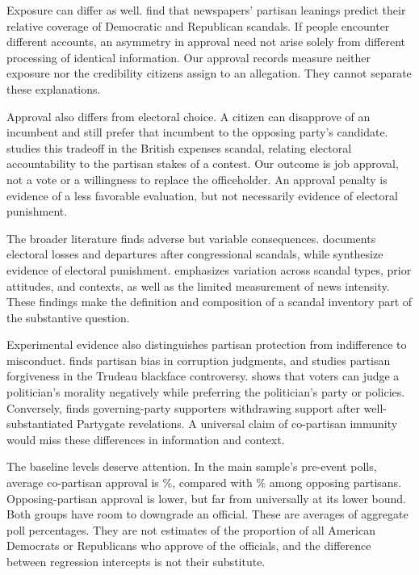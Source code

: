 \documentclass[11pt]{article}
\begin{document}
Exposure can differ as well. \citet{puglisi2011} find that newspapers' partisan leanings predict their relative coverage of Democratic and Republican scandals. If people encounter different accounts, an asymmetry in approval need not arise solely from different processing of identical information. Our approval records measure neither exposure nor the credibility citizens assign to an allegation. They cannot separate these explanations.

Approval also differs from electoral choice. A citizen can disapprove of an incumbent and still prefer that incumbent to the opposing party's candidate. \citet{eggers2014} studies this tradeoff in the British expenses scandal, relating electoral accountability to the partisan stakes of a contest. Our outcome is job approval, not a vote or a willingness to replace the officeholder. An approval penalty is evidence of a less favorable evaluation, but not necessarily evidence of electoral punishment.

The broader literature finds adverse but variable consequences. \citet{basinger2013} documents electoral losses and departures after congressional scandals, while \citet{praino2022} synthesize evidence of electoral punishment. \citet{sikorski2018} emphasizes variation across scandal types, prior attitudes, and contexts, as well as the limited measurement of news intensity. These findings make the definition and composition of a scandal inventory part of the substantive question.

Experimental evidence also distinguishes partisan protection from indifference to misconduct. \citet{anduiza2013} finds partisan bias in corruption judgments, and \citet{lee2023} studies partisan forgiveness in the Trudeau blackface controversy. \citet{funck2022} shows that voters can judge a politician's morality negatively while preferring the politician's party or policies. Conversely, \citet{onishi2026} finds governing-party supporters withdrawing support after well-substantiated Partygate revelations. A universal claim of co-partisan immunity would miss these differences in information and context.

The baseline levels deserve attention. In the main sample's pre-event polls, average co-partisan approval is \CountMainPreIn\%, compared with \CountMainPreOut\% among opposing partisans. Opposing-partisan approval is lower, but far from universally at its lower bound. Both groups have room to downgrade an official. These are averages of aggregate poll percentages. They are not estimates of the proportion of all American Democrats or Republicans who approve of the officials, and the difference between regression intercepts is not their substitute.
\end{document}
